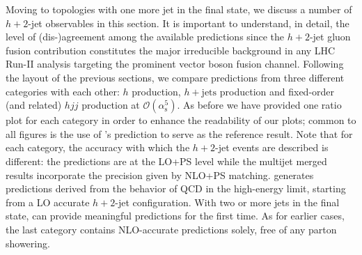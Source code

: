 Moving to topologies with one more jet in the final state, we discuss a 
number of $h+2$-jet observables in this section. It is important
to understand, in detail, the level of (dis-)agreement among the
available predictions since the $h+2$-jet gluon fusion contribution
constitutes the major irreducible background in any LHC Run-II analysis
targeting the prominent vector boson fusion channel. Following the layout 
of the previous sections, we compare predictions from three
different categories with each other: \NNLOPS $h$ production,
\MEPSatNLO $h+\text{jets}$ production and fixed-order (and related)
$hjj$ production at $\mathcal{O}(\alpha_\mathrm{s}^5)$. As before we have
provided one ratio plot for each category in order to enhance the
readability of our plots; common to all figures is the use of \Powheg's
\NNLOPS prediction to serve as the reference result. Note that for
each category, the accuracy with which the $h+2$-jet events are
described is different: the \NNLOPS predictions are at the LO+PS level
while the multijet merged results incorporate the precision given by NLO+PS
matching. \Hej generates predictions derived from the behavior of QCD
in the high-energy limit, starting from a LO accurate $h+2$-jet configuration.
With two or more jets in the final state,
\Hej can provide meaningful predictions for the first time. As
for earlier cases, the last category contains NLO-accurate predictions
solely, free of any parton showering.

